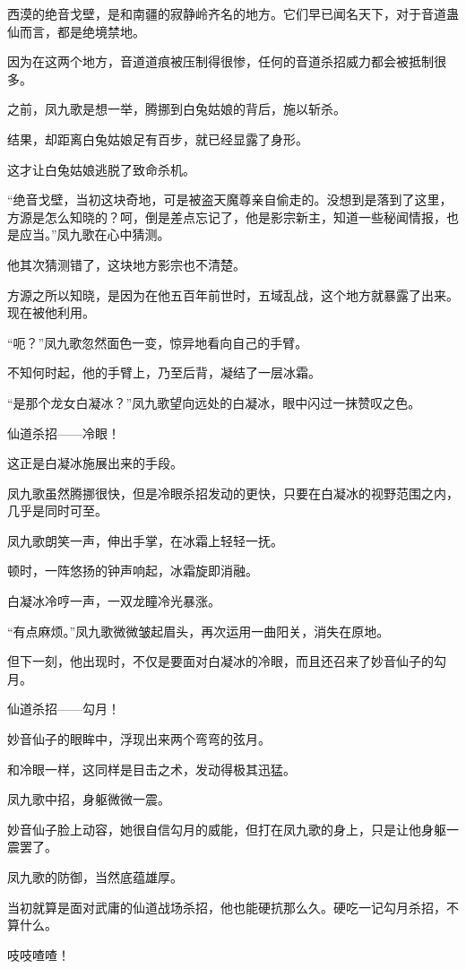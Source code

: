 \begin{this_body}
西漠的绝音戈壁，是和南疆的寂静岭齐名的地方。它们早已闻名天下，对于音道蛊仙而言，都是绝境禁地。

因为在这两个地方，音道道痕被压制得很惨，任何的音道杀招威力都会被抵制很多。

之前，凤九歌是想一举，腾挪到白兔姑娘的背后，施以斩杀。

结果，却距离白兔姑娘足有百步，就已经显露了身形。

这才让白兔姑娘逃脱了致命杀机。

“绝音戈壁，当初这块奇地，可是被盗天魔尊亲自偷走的。没想到是落到了这里，方源是怎么知晓的？呵，倒是差点忘记了，他是影宗新主，知道一些秘闻情报，也是应当。”凤九歌在心中猜测。

他其次猜测错了，这块地方影宗也不清楚。

方源之所以知晓，是因为在他五百年前世时，五域乱战，这个地方就暴露了出来。现在被他利用。

“呃？”凤九歌忽然面色一变，惊异地看向自己的手臂。

不知何时起，他的手臂上，乃至后背，凝结了一层冰霜。

“是那个龙女白凝冰？”凤九歌望向远处的白凝冰，眼中闪过一抹赞叹之色。

仙道杀招——冷眼！

这正是白凝冰施展出来的手段。

凤九歌虽然腾挪很快，但是冷眼杀招发动的更快，只要在白凝冰的视野范围之内，几乎是同时可至。

凤九歌朗笑一声，伸出手掌，在冰霜上轻轻一抚。

顿时，一阵悠扬的钟声响起，冰霜旋即消融。

白凝冰冷哼一声，一双龙瞳冷光暴涨。

“有点麻烦。”凤九歌微微皱起眉头，再次运用一曲阳关，消失在原地。

但下一刻，他出现时，不仅是要面对白凝冰的冷眼，而且还召来了妙音仙子的勾月。

仙道杀招——勾月！

妙音仙子的眼眸中，浮现出来两个弯弯的弦月。

和冷眼一样，这同样是目击之术，发动得极其迅猛。

凤九歌中招，身躯微微一震。

妙音仙子脸上动容，她很自信勾月的威能，但打在凤九歌的身上，只是让他身躯一震罢了。

凤九歌的防御，当然底蕴雄厚。

当初就算是面对武庸的仙道战场杀招，他也能硬抗那么久。硬吃一记勾月杀招，不算什么。

吱吱喳喳！


\end{this_body}
